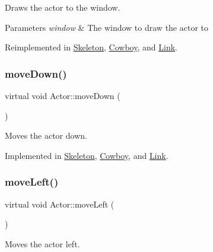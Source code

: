 Draws the actor to the window. 


\begin{DoxyParams}{Parameters}
{\em window} & The window to draw the actor to \\
\hline
\end{DoxyParams}


Reimplemented in \mbox{\hyperlink{classSkeleton_aa39ac09590a5274536dc2fc125cc62e6}{Skeleton}}, \mbox{\hyperlink{classCowboy_af7e8a3e9cdcd9054b63a3661ca3f69a6}{Cowboy}}, and \mbox{\hyperlink{classLink_ac91a924fdf779fa02d477b7f60dbdc1e}{Link}}.

\mbox{\label{classActor_ad2737cd62ea0c96f75853afb5d1fd83a}} 
\subsubsection{\texorpdfstring{moveDown()}{moveDown()}}
{\footnotesize\ttfamily virtual void Actor\+::move\+Down (\begin{DoxyParamCaption}{ }\end{DoxyParamCaption})\hspace{0.3cm}{\ttfamily [pure virtual]}}



Moves the actor down. 



Implemented in \mbox{\hyperlink{classSkeleton_aee2055fa3d1db80392b365aa40c878bf}{Skeleton}}, \mbox{\hyperlink{classCowboy_a25b9c66203a4a5e762984ca0bed511e0}{Cowboy}}, and \mbox{\hyperlink{classLink_a9ff8ec271a0119f6e1ee178afb47f323}{Link}}.

\mbox{\label{classActor_a522d6069bacaa9985db7a234bde2c8b6}} 
\subsubsection{\texorpdfstring{moveLeft()}{moveLeft()}}
{\footnotesize\ttfamily virtual void Actor\+::move\+Left (\begin{DoxyParamCaption}{ }\end{DoxyParamCaption})\hspace{0.3cm}{\ttfamily [pure virtual]}}



Moves the actor left. 



